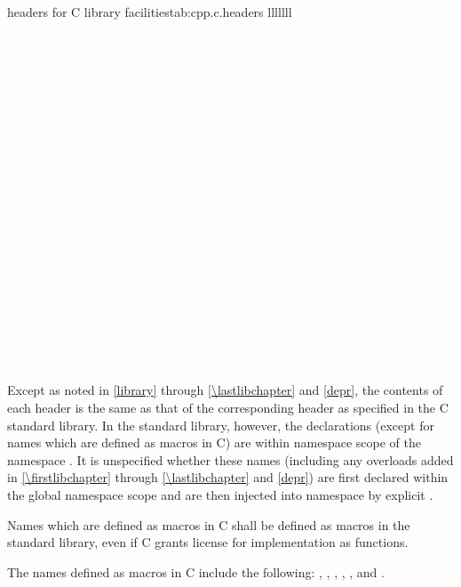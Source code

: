\begin{multicolfloattable}{\Cpp{} headers for C library facilities}{tab:cpp.c.headers}
{lllllll}
 \\
 \\
 \\
\columnbreak
{} \\
 \\
 \\
\columnbreak
{} \\
 \\
 \\
\columnbreak
{} \\
 \\
 \\
\columnbreak
{} \\
 \\
 \\
\columnbreak
{} \\
 \\
 \\
\columnbreak
{} \\
 \\
 \\
\end{multicolfloattable}

\pnum
Except as noted in \ref{library} through \ref{\lastlibchapter}
and \ref{depr}, the contents of each header  is
the same as that of the corresponding header  as
specified in the C standard library.
In the \Cpp{} standard library, however, the
declarations (except for names which are defined as macros in C) are within
namespace scope of the namespace .
It is unspecified whether these names (including any overloads added in
\ref{\firstlibchapter} through \ref{\lastlibchapter} and \ref{depr})
are first declared within the global namespace scope
and are then injected into namespace  by explicit
.

\pnum
Names which are defined as macros in C shall be defined as macros in the \Cpp{}
standard library, even if C grants license for implementation as functions.
\begin{note} The names defined as macros in C include the following:
, , , ,
, and . \end{note}

